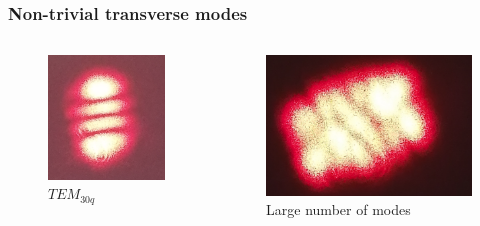 \documentclass{beamer}
\begin{document}
	\begin{frame}
		\frametitle{Non-trivial transverse modes}
		\begin{columns}
			\begin{column}{0.3\textwidth}
				\begin{figure}
					\centering
					\includegraphics[width=1\linewidth]{res/tem30.png}
					\vspace{-10pt}
					\caption{\footnotesize  $TEM_{30q}$}
				\end{figure}
			\end{column}
			\begin{column}{0.3\textwidth}
				\begin{figure}
					\centering
					\includegraphics[width=1.2\linewidth]{res/tem_highmode.png}
					\vspace{-10pt}
					\caption{\footnotesize Large number of modes}
				\end{figure}
			\end{column}
		\end{columns}	
		

\end{frame}
\end{document}
